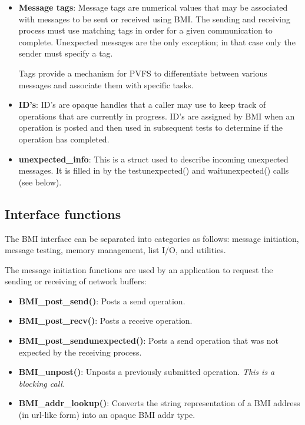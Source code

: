 \documentclass[11pt]{article}
\begin{document}
\begin{itemize}

\item \textbf{Message tags}:  Message tags are numerical values that may
be associated with messages to be sent or received using BMI.  The
sending and receiving process must use matching tags in order for a
given communication to complete.  Unexpected messages are the only
exception; in that case only the sender must specify a tag.  

Tags provide a mechanism for PVFS to differentiate between various
messages and associate them with specific tasks.

\item \textbf{ID's}:  ID's are opaque handles that a caller may use to
keep track of operations that are currently in progress.  ID's are
assigned by BMI when an operation is posted and then used in subsequent tests
to determine if the operation has completed.

\item \textbf{unexpected\_info}: This is a struct used to
describe incoming unexpected messages.  It is filled in by the
testunexpected() and waitunexpected() calls (see below).

\end{itemize}

\subsection{Interface functions}

The BMI interface can be separated into categories as follows:  message
initiation, message testing, memory management, list I/O, and utilities. 

The message initiation functions are used by an application to 
request the sending or receiving of network buffers:

\begin{itemize}
\item \textbf{BMI\_post\_send()}: Posts a send operation.
\item \textbf{BMI\_post\_recv()}: Posts a receive operation.
\item \textbf{BMI\_post\_sendunexpected()}: Posts a send operation
that was not expected by the receiving process.
\item \textbf{BMI\_unpost()}: Unposts a previously submitted
operation.  \emph{This is a blocking call.}
\item \textbf{BMI\_addr\_lookup()}: Converts the string
representation of a BMI address (in url-like form) into an opaque
BMI addr type.
\end{itemize}
\end{document}
